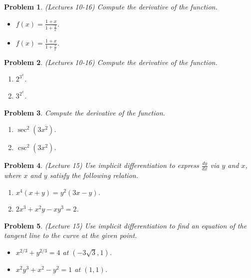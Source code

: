 \documentclass{article}
\newtheorem{problem}{Problem}
\begin{document}
\begin{problem}(Lectures 10-16)
Compute the derivative of the function.
\begin{itemize}
\item $f(x)=\frac{1+x }{1+\frac{2}x}$.
\item $f(x)=\frac{1+x }{1+\frac{3}x}$.
\end{itemize}
\end{problem}

\begin{problem}(Lectures 10-16) Compute the derivative of the function.
\begin{enumerate}
\item $2^{3^x}$.
\item $3^{2^x}$.
\end{enumerate}
\end{problem}
\begin{problem}Compute the derivative of the function.
\begin{enumerate}
\item $\sec^2 (3x^2)$. 
\item $\csc^2 (3x^2)$. 
\end{enumerate}
\end{problem}

\begin{problem}(Lecture 15)
Use implicit differentiation to express $\frac{dy}{dx}$ via $y $ and $x$, where $x$ and $y$ satisfy the following relation.
\begin{enumerate}
\item  $x^4(x+y)=y^2(3x-y)$.
\item $2x^3+x^2y-xy^3=2$.
\end{enumerate}
\end{problem}

\begin{problem} (Lecture 15)
Use implicit differentiation to find an equation of the tangent line to the curve at the given point.
\begin{itemize}
\item $x^{2/3}+y^{2/3}=4$ at $(-3\sqrt{3}, 1)$. 
\item $x^2y^3+x^2-y^2=1$ at $(1,1)$. 
\end{itemize}
\end{problem}
\end{document}
